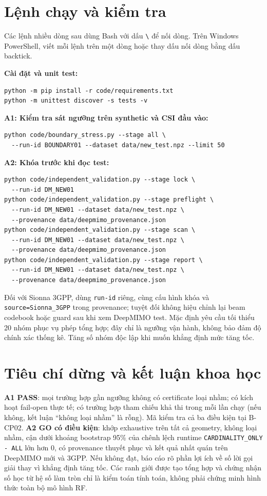 \documentclass[11pt,onecolumn]{IEEEtran}
\begin{document}
\section{Lệnh chạy và kiểm tra}
Các lệnh nhiều dòng sau dùng Bash với dấu \texttt{\textbackslash} để nối dòng. Trên Windows PowerShell, viết mỗi lệnh trên một dòng hoặc thay dấu nối dòng bằng dấu backtick.\par
\noindent\textbf{Cài đặt và unit test:}
\begin{verbatim}
python -m pip install -r code/requirements.txt
python -m unittest discover -s tests -v
\end{verbatim}
\noindent\textbf{A1: Kiểm tra sát ngưỡng trên synthetic và CSI đầu vào:}
\begin{verbatim}
python code/boundary_stress.py --stage all \
  --run-id BOUNDARY01 --dataset data/new_test.npz --limit 50
\end{verbatim}
\noindent\textbf{A2: Khóa trước khi đọc test:}
\begin{verbatim}
python code/independent_validation.py --stage lock \
  --run-id DM_NEW01
python code/independent_validation.py --stage preflight \
  --run-id DM_NEW01 --dataset data/new_test.npz \
  --provenance data/deepmimo_provenance.json
python code/independent_validation.py --stage scan \
  --run-id DM_NEW01 --dataset data/new_test.npz \
  --provenance data/deepmimo_provenance.json
python code/independent_validation.py --stage report \
  --run-id DM_NEW01 --dataset data/new_test.npz \
  --provenance data/deepmimo_provenance.json
\end{verbatim}
Đối với Sionna 3GPP, dùng \texttt{run-id} riêng, cùng cấu hình khóa và \texttt{source=Sionna\_3GPP} trong provenance; tuyệt đối không hiệu chỉnh lại beam codebook hoặc guard sau khi xem DeepMIMO test. Mặc định yêu cầu tối thiểu 20 nhóm phục vụ phép tổng hợp; đây chỉ là ngưỡng vận hành, không bảo đảm độ chính xác thống kê. Tăng số nhóm độc lập khi muốn khẳng định mức tăng tốc.

\section{Tiêu chí dừng và kết luận khoa học}
\textbf{A1 PASS}: mọi trường hợp gần ngưỡng không có certificate loại nhầm; có kích hoạt fail-open thực tế; có trường hợp tham chiếu khả thi trong mỗi lần chạy (nếu không, kết luận ``không loại nhầm'' là rỗng). Mã kiểm tra cả ba điều kiện tại B-CP02. \textbf{A2 GO có điều kiện}: khớp exhaustive trên tất cả geometry, không loại nhầm, cận dưới khoảng bootstrap 95\% của chênh lệch runtime \texttt{CARDINALITY\_ONLY - ALL} lớn hơn 0, có provenance thuyết phục và kết quả nhất quán trên DeepMIMO mới và 3GPP. Nếu không đạt, báo cáo rõ phần lợi ích về số lời gọi giải thay vì khẳng định tăng tốc. Các ranh giới được tạo tổng hợp và chứng nhận số học từ hệ số làm tròn chỉ là kiểm toán tính toán, không phải chứng minh hình thức toàn bộ mô hình RF.
\end{document}
